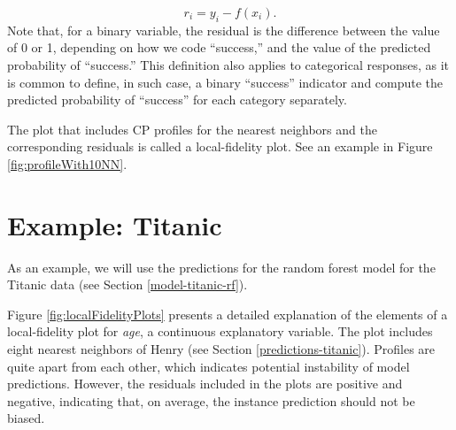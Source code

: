 \documentclass[]{krantz}
\begin{document}
\[
r_i = y_i - f(x_i).
\]
Note that, for a binary variable, the residual is the difference between the value of 0 or 1, depending on how we code ``success,'' and the value of the predicted probability of ``success.'' This definition also applies to categorical responses, as it is common to define, in such case, a binary ``success'' indicator and compute the predicted probability of ``success'' for each category separately.

The plot that includes CP profiles for the nearest neighbors and the corresponding residuals is called a local-fidelity plot. See an example in Figure \ref{fig:profileWith10NN}.

\hypertarget{cPLocDiagExample}{%
\section{Example: Titanic}\label{cPLocDiagExample}}

As an example, we will use the predictions for the random forest model for the Titanic data (see Section \ref{model-titanic-rf}).

Figure \ref{fig:localFidelityPlots} presents a detailed explanation of the elements of a local-fidelity plot for \emph{age}, a continuous explanatory variable. The plot includes eight nearest neighbors of Henry (see Section \ref{predictions-titanic}). Profiles are quite apart from each other, which indicates potential instability of model predictions. However, the residuals included in the plots are positive and negative, indicating that, on average, the instance prediction should not be biased.
\end{document}
